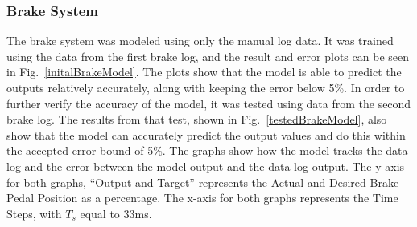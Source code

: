 \documentclass[conference]{IEEEtran}
\begin{document}
\subsubsection{Brake System}

The brake system was modeled using only the manual log data. It was trained using the data from the first brake log, and the result and error plots can be seen in Fig.~\ref{initalBrakeModel}. The plots show that the model is able to predict the outputs relatively accurately, along with keeping the error below 5\%. In order to further verify the accuracy of the model, it was tested using data from the second brake log. The results from that test, shown in Fig.~\ref{testedBrakeModel}, also show that the model can accurately predict the output values and do this within the accepted error bound of 5\%. The graphs show how the model tracks the data log and the error between the model output and the data log output. The y-axis for both graphs, “Output and Target” represents the Actual and Desired Brake Pedal Position as a percentage. The x-axis for both graphs represents the Time Steps, with $T_s$ equal to 33ms.
\end{document}

